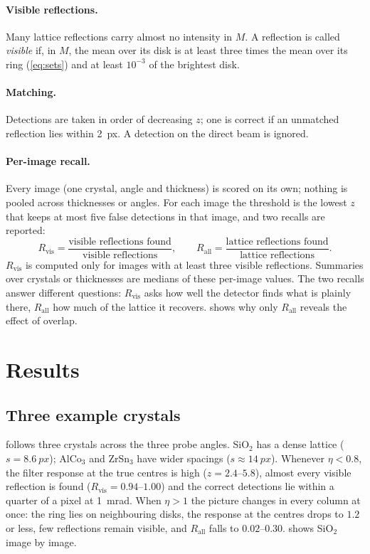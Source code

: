 \documentclass[11pt,a4paper]{article}
\newcommand{\Rvis}{R_{\mathrm{vis}}}
\newcommand{\Rall}{R_{\mathrm{all}}}
\begin{document}
\paragraph{Visible reflections.} Many lattice reflections carry almost no intensity in $M$. A reflection is called
\emph{visible} if, in $M$, the mean over its disk is at least three times the mean over its ring (\cref{eq:sets}) and at least
$10^{-3}$ of the brightest disk.

\paragraph{Matching.} Detections are taken in order of decreasing $z$; one is correct if an unmatched reflection lies within
\SI{2}{px}. A detection on the direct beam is ignored.

\paragraph{Per-image recall.} Every image (one crystal, angle and thickness) is scored on its own; nothing is pooled across
thicknesses or angles. For each image the threshold is the lowest $z$ that keeps at most five false detections in that image,
and two recalls are reported:
\begin{equation}
  \Rvis = \frac{\text{visible reflections found}}{\text{visible reflections}}, \qquad
  \Rall = \frac{\text{lattice reflections found}}{\text{lattice reflections}} .
  \label{eq:recall}
\end{equation}
$\Rvis$ is computed only for images with at least three visible reflections. Summaries over crystals or thicknesses are
medians of these per-image values. The two recalls answer different questions: $\Rvis$ asks how well the detector finds
what is plainly there, $\Rall$ how much of the lattice it recovers.  shows why only $\Rall$ reveals the
effect of overlap.

\section{Results}\label{sec:results}

\subsection{Three example crystals}
 follows three crystals across the three probe angles. SiO$_2$ has a dense lattice
($s = \SI{8.6}{px}$); AlCo$_3$ and ZrSn$_3$ have wider spacings ($s \approx \SI{14}{px}$). Whenever $\eta < 0.8$, the filter
response at the true centres is high ($z = 2.4$--$5.8$), almost every visible reflection is found ($\Rvis = 0.94$--$1.00$)
and the correct detections lie within a quarter of a pixel at \SI{1}{\milli\radian}. When $\eta > 1$ the picture changes
in every column at once: the ring lies on neighbouring disks, the response at the centres drops to $1.2$ or less, few
reflections remain visible, and $\Rall$ falls to $0.02$--$0.30$.  shows SiO$_2$ image by image.
\end{document}
